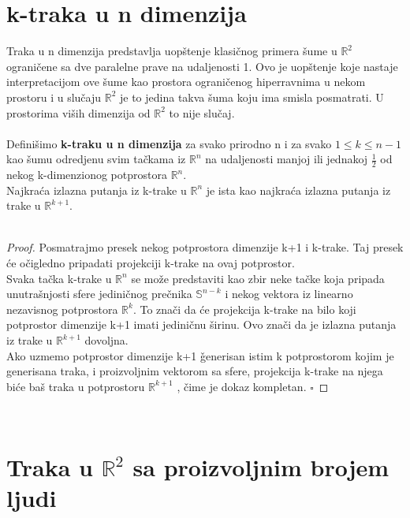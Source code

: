 \documentclass[11pt,letter]{article}
\begin{document}
\section[k-traka u n dimenzija]{k-traka u n dimenzija}
\bigskip
\indent Traka u n dimenzija predstavlja uop\v stenje klasi\v cnog primera \v sume u $\mathbb{R}^2$ ograni\v cene sa dve paralelne prave na udaljenosti 1. Ovo je uop\v stenje koje nastaje interpretacijom ove \v sume kao prostora ograni\v cenog hiperravnima u nekom prostoru i u slu\v caju $\mathbb{R}^2$ je to jedina takva \v suma koju ima smisla posmatrati. U prostorima vi\v sih dimenzija od $\mathbb{R}^2$ to nije slu\v caj.
\\
\smallskip
\\
\indent Defini\v simo \textbf{k-traku u n dimenzija} za svako prirodno n i za svako $1\leqslant k\leqslant n-1$  kao \v sumu odredjenu svim ta\v ckama iz $\mathbb{R}^n$ na udaljenosti manjoj ili jednakoj $\frac{1}{2}$ od nekog k-dimenzionog potprostora $\mathbb{R}^n$. 
\\
\teo Najkra\' ca izlazna putanja iz k-trake u $\mathbb{R}^n$ je ista kao najkra\' ca izlazna putanja iz trake u $\mathbb{R}^{k+1}$.
\\
\smallskip
\\
\begin{proof}
Posmatrajmo presek nekog potprostora dimenzije k+1 i k-trake. Taj presek \' ce o\v cigledno pripadati projekciji k-trake na ovaj potprostor.
\\
\indent  Svaka ta\v cka k-trake u $\mathbb{R}^n$ se mo\v ze predstaviti kao zbir neke ta\v cke koja pripada unutra\v snjosti sfere jedini\v cnog pre\v cnika $\mathbb{S}^{n-k}$ i nekog vektora iz linearno nezavisnog potprostora $\mathbb{R}^k$. To zna\v ci da \' ce projekcija k-trake na bilo koji potprostor dimenzije k+1 imati jedini\v cnu \v sirinu. Ovo zna\v ci da je izlazna putanja iz trake u  $\mathbb{R}^{k+1}$ dovoljna. 
\\
\indent Ako uzmemo potprostor dimenzije k+1 \v generisan istim k potprostorom kojim je generisana traka, i proizvoljnim vektorom sa sfere, projekcija k-trake na njega bi\' ce ba\v s traka u potprostoru $\mathbb{R}^{k+1}$ , \v cime je dokaz kompletan.
$\square$
\end{proof}
\\

\section[Traka u $\mathbb{R}^2$ sa proizvoljnim brojem ljudi]{Traka u $\mathbb{R}^2$ sa proizvoljnim brojem ljudi}
\end{document}
